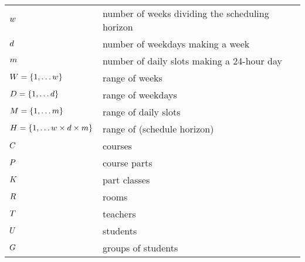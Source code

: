 \documentclass[runningheads]{llncs}
\begin{document}
\begin{table}[!t]
\begin{center}
\begin{tabular}{|l|l|}



\hline
$w$                                 & number of weeks
dividing the scheduling horizon
\\$d$                               & number of weekdays
making a week \\
$m$                              &  number of daily slots
making a 24-hour day\\
$W =\{1,\ldots w\}$
&  range of weeks 
\\
$D =\{1,\ldots d\}$
&  range of weekdays 
\\
$M =\{1,\ldots m\}$
&  range of daily slots 
\\
$H=\{1,\ldots w\times d\times m\}$
&  range of \timepoints{} (schedule horizon)
\\\hline
$C$&  courses
\\
$P$&  course parts
\\
$K$&  part classes
\\
$R$&  rooms
\\
$T$&  teachers
\\
$U$&  students
\\
$G$&  groups of students


\end{tabular}
\end{center}
\end{table}
\end{document}
